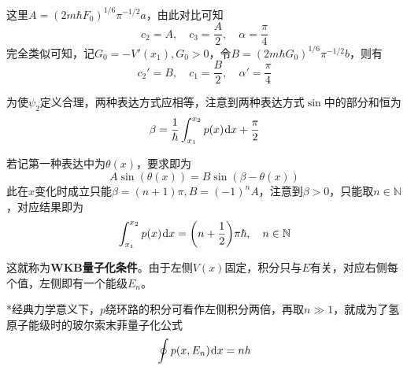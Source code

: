 \documentclass[a4paper,UTF8,fontset=windows]{ctexart}
\newcommand*{\dr}{\hspace{0.07em}\mathrm{d}}
\begin{document}
这里$A=(2m\hbar F_0)^{1/6}\pi^{-1/2}a$，由此对比可知
$$c_2=A,\quad c_3=\frac{A}{2},\quad\alpha=\frac{\pi}{4}$$
完全类似可知，记$G_0=-V'(x_1),G_0>0$，令$B=(2m\hbar G_0)^{1/6}\pi^{-1/2}b$，则有
$$c_2'=B,\quad c_1=\frac{B}{2},\quad\alpha'=\frac{\pi}{4}$$

为使$\psi_2$定义合理，两种表达方式应相等，注意到两种表达方式$\sin$中的部分和恒为
$$\beta=\frac{1}{\hbar}\int_{x_1}^{x_2}p(x)\dr x+\frac{\pi}{2}$$

若记第一种表达中为$\theta(x)$，要求即为
$$A\sin(\theta(x))=B\sin(\beta-\theta(x))$$
此在$x$变化时成立只能$\beta=(n+1)\pi,B=(-1)^nA$，注意到$\beta>0$，只能取$n\in\mathbb{N}$，对应结果即为
$$\int_{x_1}^{x_2}p(x)\dr x=\bigg(n+\frac{1}{2}\bigg)\pi\hbar,\quad n\in\mathbb{N}$$

这就称为\textbf{WKB量子化条件}。由于左侧$V(x)$固定，积分只与$E$有关，对应右侧每个值，左侧即有一个能级$E_n$。

*经典力学意义下，$p$绕环路的积分可看作左侧积分两倍，再取$n\gg1$，就成为了氢原子能级时的玻尔索末菲量子化公式
$$\oint p(x,E_n)\dr x=nh$$

\
\end{document}
